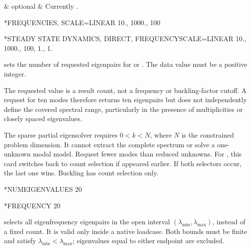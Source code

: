 \begin{keywordparameters}
 & optional & Currently . \\
\end{keywordparameters}

\exampleheading
\begin{dialectexamples}
\begin{femasterdeck}
*FREQUENCIES, SCALE=LINEAR
10., 1000., 100
\end{femasterdeck}
\begin{abaqusdeck}
*STEADY STATE DYNAMICS, DIRECT,
 FREQUENCYSCALE=LINEAR
10., 1000., 100, 1., 1.
\end{abaqusdeck}
\end{dialectexamples}


 sets the number of requested eigenpairs for  or . The data value must be a positive integer.

The requested value is a result count, not a frequency or buckling-factor cutoff. A request for ten modes therefore returns ten eigenpairs but does not independently define the covered spectral range, particularly in the presence of multiplicities or closely spaced eigenvalues.

The sparse partial eigensolver requires \(0<k<N\), where \(N\) is the constrained problem dimension. It cannot extract the complete spectrum or solve a one-unknown modal model. Request fewer modes than reduced unknowns. For , this card switches back to count selection if  appeared earlier. If both selectors occur, the last one wins. Buckling has count selection only.

\exampleheading
\begin{dialectexamples}
\begin{femasterdeck}
*NUMEIGENVALUES
20
\end{femasterdeck}
\begin{abaqusdeck}
*FREQUENCY
20
\end{abaqusdeck}
\end{dialectexamples}


 selects all eigenfrequency eigenpairs in the open interval \((\lambda_{\min},\lambda_{\max})\), instead of a fixed count. It is valid only inside a native  loadcase. Both bounds must be finite and satisfy \(\lambda_{\min}<\lambda_{\max}\); eigenvalues equal to either endpoint are excluded.

